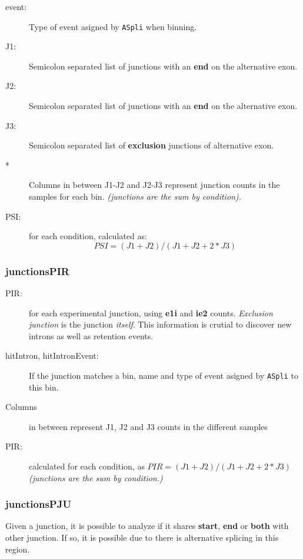 \documentclass{article}
\begin{document}
\begin{description}
\item [event:] Type of event asigned by \texttt{ASpli} when binning. 
\item [J1:] Semicolon separated list of junctions with an \textbf{end} on the alternative exon. 
\item [J2:] Semicolon separated list of junctions with an \textbf{end} on the alternative exon. 
\item [J3:] Semicolon separated list of \textbf{exclusion} junctions of alternative exon. 

\item [*] Columns in between J1-J2 and J2-J3 represent junction counts in the samples for each bin. \textit{(junctions are the sum by condition).}

\item [PSI:] for each condition, calculated as: $$ PSI = (J1 + J2)/(J1 + J2 + 2*J3) $$ 
\end{description}

\subsubsection*{junctionsPIR}
\begin{description}
\item [PIR:] for each experimental junction, using \textbf{e1i} and \textbf{ie2} counts. \textit{Exclusion junction} is the junction \textit{itself}. This information is crutial to discover new introns as well as retention events. 
\item [hitIntron, hitIntronEvent:] If the junction matches a bin, name and type of event asigned by \texttt{ASpli} to this bin. 
\item [Columns] in between represent J1, J2 and J3 counts in the different samples 
\item [PIR:] calculated for each condition, as $ PIR = (J1 + J2)/(J1 + J2 + 2*J3) $ \textit{(junctions are the sum by condition.)}
\end{description}

\subsubsection*{junctionsPJU}
Given a junction, it is possible to analyze if it shares \textbf{start}, \textbf{end} or \textbf{both} with other junction. If so, it is possible due to there is alternative splicing in this region. 
\end{document}

